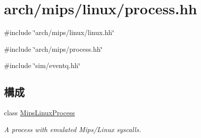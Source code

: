 \hypertarget{arch_2mips_2linux_2process_8hh}{
\section{arch/mips/linux/process.hh}
\label{arch_2mips_2linux_2process_8hh}
}
{\ttfamily \#include \char`\"{}arch/mips/linux/linux.hh\char`\"{}}\par
{\ttfamily \#include \char`\"{}arch/mips/process.hh\char`\"{}}\par
{\ttfamily \#include \char`\"{}sim/eventq.hh\char`\"{}}\par
\subsection*{構成}
\begin{DoxyCompactItemize}
\item 
class \hyperlink{classMipsLinuxProcess}{MipsLinuxProcess}
\begin{DoxyCompactList}\small\item\em A process with emulated Mips/Linux syscalls. \item\end{DoxyCompactList}\end{DoxyCompactItemize}
